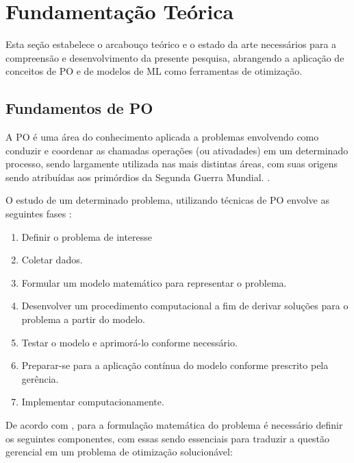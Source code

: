 \chapter{Fundamentação Teórica}
\label{cap:fundamentacao-teorica}

Esta seção estabelece o arcabouço teórico e o estado da arte necessários para a compreensão e desenvolvimento da presente pesquisa, abrangendo a aplicação de conceitos de \gls{PO} e de modelos de \gls{ML} como ferramentas de otimização.

\section{Fundamentos de \gls{PO}}
\label{sec:po_fundamentos}

A \gls{PO} é uma área do conhecimento aplicada a problemas envolvendo como conduzir e coordenar as chamadas operações (ou ativadades) em um determinado processo, sendo largamente utilizada nas mais distintas áreas, com suas origens sendo atribuídas aos primórdios da Segunda Guerra Mundial.
\cite{hillier2013introduccao}.

O estudo de um determinado problema, utilizando técnicas de \gls{PO} envolve as seguintes fases \cite{hillier2013introduccao}:

\begin{enumerate}
    \item Definir o problema de interesse 
    \item Coletar dados.
    \item Formular um modelo matemático para representar o problema.
    \item Desenvolver um procedimento computacional a fim de derivar soluções para o problema a partir do modelo.
    \item Testar o modelo e aprimorá-lo conforme necessário.
    \item Preparar-se para a aplicação contínua do modelo conforme prescrito pela gerência.
    \item Implementar computacionamente.
\end{enumerate}

De acordo com \cite{hillier2013introduccao}, para a formulação matemática do problema é necessário definir os seguintes componentes, com essas sendo essenciais para traduzir a questão gerencial em um problema de otimização solucionável:

